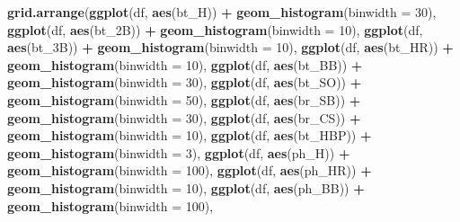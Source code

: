 \documentclass[]{article}
\newenvironment{Shaded}{\begin{snugshade}}{\end{snugshade}}
\newcommand{\DataTypeTok}[1]{\textcolor[rgb]{0.13,0.29,0.53}{#1}}
\newcommand{\DecValTok}[1]{\textcolor[rgb]{0.00,0.00,0.81}{#1}}
\newcommand{\KeywordTok}[1]{\textcolor[rgb]{0.13,0.29,0.53}{\textbf{#1}}}
\newcommand{\NormalTok}[1]{#1}
\newcommand{\OperatorTok}[1]{\textcolor[rgb]{0.81,0.36,0.00}{\textbf{#1}}}
\newcommand{\StringTok}[1]{\textcolor[rgb]{0.31,0.60,0.02}{#1}}
\begin{document}
\begin{Shaded}
\begin{Highlighting}[]
\KeywordTok{grid.arrange}\NormalTok{(}\KeywordTok{ggplot}\NormalTok{(df, }\KeywordTok{aes}\NormalTok{(bt_H)) }\OperatorTok{+}\StringTok{ }\KeywordTok{geom_histogram}\NormalTok{(}\DataTypeTok{binwidth =} \DecValTok{30}\NormalTok{),}
             \KeywordTok{ggplot}\NormalTok{(df, }\KeywordTok{aes}\NormalTok{(bt_2B)) }\OperatorTok{+}\StringTok{ }\KeywordTok{geom_histogram}\NormalTok{(}\DataTypeTok{binwidth =} \DecValTok{10}\NormalTok{),}
             \KeywordTok{ggplot}\NormalTok{(df, }\KeywordTok{aes}\NormalTok{(bt_3B)) }\OperatorTok{+}\StringTok{ }\KeywordTok{geom_histogram}\NormalTok{(}\DataTypeTok{binwidth =} \DecValTok{10}\NormalTok{),}
             \KeywordTok{ggplot}\NormalTok{(df, }\KeywordTok{aes}\NormalTok{(bt_HR)) }\OperatorTok{+}\StringTok{ }\KeywordTok{geom_histogram}\NormalTok{(}\DataTypeTok{binwidth =} \DecValTok{10}\NormalTok{),}
             \KeywordTok{ggplot}\NormalTok{(df, }\KeywordTok{aes}\NormalTok{(bt_BB)) }\OperatorTok{+}\StringTok{ }\KeywordTok{geom_histogram}\NormalTok{(}\DataTypeTok{binwidth =} \DecValTok{30}\NormalTok{),}
             \KeywordTok{ggplot}\NormalTok{(df, }\KeywordTok{aes}\NormalTok{(bt_SO)) }\OperatorTok{+}\StringTok{ }\KeywordTok{geom_histogram}\NormalTok{(}\DataTypeTok{binwidth =} \DecValTok{50}\NormalTok{),}
             \KeywordTok{ggplot}\NormalTok{(df, }\KeywordTok{aes}\NormalTok{(br_SB)) }\OperatorTok{+}\StringTok{ }\KeywordTok{geom_histogram}\NormalTok{(}\DataTypeTok{binwidth =} \DecValTok{30}\NormalTok{),}
             \KeywordTok{ggplot}\NormalTok{(df, }\KeywordTok{aes}\NormalTok{(br_CS)) }\OperatorTok{+}\StringTok{ }\KeywordTok{geom_histogram}\NormalTok{(}\DataTypeTok{binwidth =} \DecValTok{10}\NormalTok{),}
             \KeywordTok{ggplot}\NormalTok{(df, }\KeywordTok{aes}\NormalTok{(bt_HBP)) }\OperatorTok{+}\StringTok{ }\KeywordTok{geom_histogram}\NormalTok{(}\DataTypeTok{binwidth =} \DecValTok{3}\NormalTok{),}
             \KeywordTok{ggplot}\NormalTok{(df, }\KeywordTok{aes}\NormalTok{(ph_H)) }\OperatorTok{+}\StringTok{ }\KeywordTok{geom_histogram}\NormalTok{(}\DataTypeTok{binwidth =} \DecValTok{100}\NormalTok{),}
             \KeywordTok{ggplot}\NormalTok{(df, }\KeywordTok{aes}\NormalTok{(ph_HR)) }\OperatorTok{+}\StringTok{ }\KeywordTok{geom_histogram}\NormalTok{(}\DataTypeTok{binwidth =} \DecValTok{10}\NormalTok{),}
             \KeywordTok{ggplot}\NormalTok{(df, }\KeywordTok{aes}\NormalTok{(ph_BB)) }\OperatorTok{+}\StringTok{ }\KeywordTok{geom_histogram}\NormalTok{(}\DataTypeTok{binwidth =} \DecValTok{100}\NormalTok{),}

\end{Highlighting}
\end{Shaded}
\end{document}
